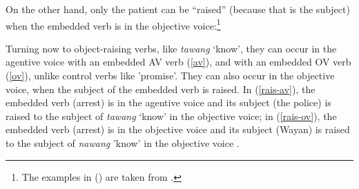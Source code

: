 \documentclass[output=paper
	        ,collection
	        ,collectionchapter
 	        ,biblatex
                ,babelshorthands
                ,newtxmath
                ,draftmode
                ,colorlinks, citecolor=brown
]{langscibook}
\begin{document}
On the other hand, only the patient can be ``raised'' (because that is the subject) when the embedded verb is in the objective voice:\footnote{
The examples in () are taken from .
}

\eal
{}
\zl


Turning now to object-raising verbs, like \emph{tawang} `know',  they can occur in the agentive voice with an embedded AV verb (\ref{av}), and with an embedded OV verb (\ref{ov}), unlike control verbs like 'promise'. 
They can also occur in the objective voice, when the subject of the embedded verb is raised.
In (\ref{rais-av}), the embedded verb (arrest) is in the agentive voice and its subject (the police) is raised to the subject of \emph{tawang} `know' in the objective voice; in (\ref{rais-ov}), the embedded verb (arrest) is in the objective voice and its subject (Wayan) is raised to the subject of \emph{nawang} 'know' in the objective voice \citep[ex 23]{WechslerandArka1998}.
\end{document}
